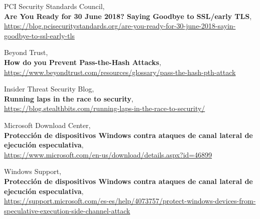 \documentclass[10pt,a4paper]{article}
\begin{document}
\begin{thebibliography}{9}
	PCI Security Standards Council,\\
	\textbf{Are You Ready for 30 June 2018? Saying Goodbye to SSL/early TLS},\\
	\footnotesize
	\url{https://blog.pcisecuritystandards.org/are-you-ready-for-30-june-2018-sayin-goodbye-to-ssl-early-tls}
	\normalsize

	Beyond Trust,\\
	\textbf{How do you Prevent Pass-the-Hash Attacks},\\
	\url{https://www.beyondtrust.com/resources/glossary/pass-the-hash-pth-attack}

	Insider Threat Security Blog,\\
	\textbf{Running laps in the race to security},\\
	\url{https://blog.stealthbits.com/running-laps-in-the-race-to-security/}

	Microsoft Download Center,\\
	\textbf{Protección de dispositivos Windows contra ataques de canal lateral de ejecución especulativa},\\
	\url{https://www.microsoft.com/en-us/download/details.aspx?id=46899}
	
	Windows Support,\\
	\textbf{Protección de dispositivos Windows contra ataques de canal lateral de ejecución especulativa},\\
	\footnotesize
	\url{https://support.microsoft.com/es-es/help/4073757/protect-windows-devices-from-speculative-execution-side-channel-attack}
	\normalsize
	

\end{thebibliography}
\end{document}
